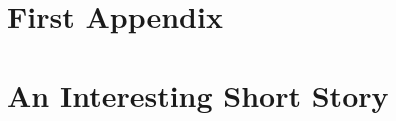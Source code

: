 \documentclass[pdftex]{pucthesis}	          %
\begin{document}

\cleardoublepage
{} \label{references}

\renewcommand{\bibname}{REFERENCES}

\setlength{\bibleftmargin}{0em}
\setlength{\bibindent}{0em}
\setlength{\bibitemsep}{1em}





\appendix %

\newpage
\section[First Appendix]{First Appendix}


\newpage
\section[An Interesting Short Story]{An Interesting Short Story}

\end{document}
